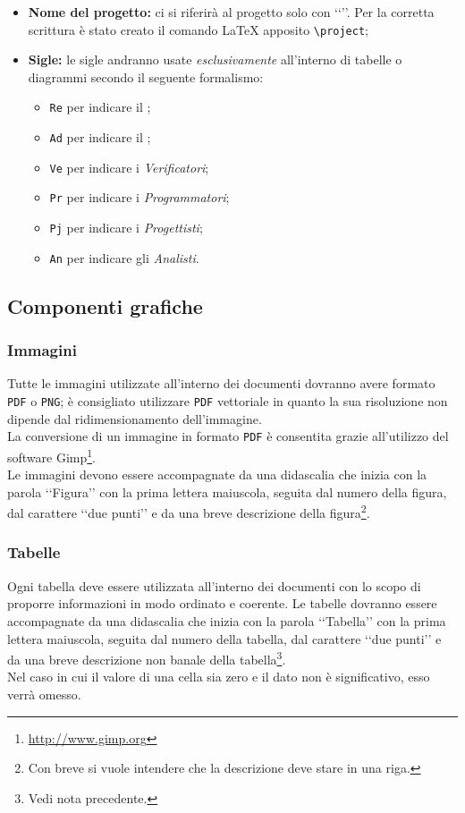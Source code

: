 \begin{itemize}
\item \textbf{Nome del progetto:} ci si riferirà al progetto solo con \lq\lq{}\project\rq\rq{}. Per la corretta scrittura è stato creato il comando \LaTeX{} apposito \verb!\project!;
\item \textbf{Sigle:} le sigle andranno usate \emph{esclusivamente} all'interno di tabelle o diagrammi secondo il seguente formalismo:
\begin{itemize}
\item \verb!Re! per indicare il \projectManager{};
\item \verb!Ad! per indicare il \administrator{};
\item \verb!Ve! per indicare i \emph{Verificatori};
\item \verb!Pr! per indicare i \emph{Programmatori};
\item \verb!Pj! per indicare i \emph{Progettisti};
\item \verb!An! per indicare gli \emph{Analisti}.
\end{itemize} 
\end{itemize}

\subsection{Componenti grafiche}
\label{componentigrafiche}

\subsubsection{Immagini}
\label{immagini}
Tutte le immagini utilizzate all'interno dei documenti dovranno avere formato \verb!PDF!\glossario{} o \verb!PNG!\glossario{}; è consigliato utilizzare \verb!PDF!\glossario{} vettoriale in quanto la sua risoluzione non dipende dal ridimensionamento dell'immagine.
\\La conversione di un immagine in formato \verb!PDF!\glossario{} è consentita grazie all'utilizzo del software Gimp\footnote{\url{http://www.gimp.org}}.
\\Le immagini devono essere accompagnate da una didascalia che inizia con la parola \lq\lq{}Figura\rq\rq{} con la prima lettera maiuscola, seguita dal numero della figura, dal carattere \lq\lq{}due punti\rq\rq{} e da una breve descrizione della figura\footnote{Con breve si vuole intendere che la descrizione deve stare in una riga.}.

\subsubsection{Tabelle}
\label{tabelle}
Ogni tabella deve essere utilizzata all'interno dei documenti con lo scopo di proporre informazioni in modo ordinato e coerente. Le tabelle dovranno essere accompagnate da una didascalia che inizia con la parola \lq\lq{}Tabella\rq\rq{} con la prima lettera maiuscola, seguita dal numero della tabella, dal carattere \lq\lq{}due punti\rq\rq{} e da una breve descrizione non banale della tabella\footnote{Vedi nota precedente.}.
\\Nel caso in cui il valore di una cella sia zero e il dato non è significativo, esso verrà omesso.
